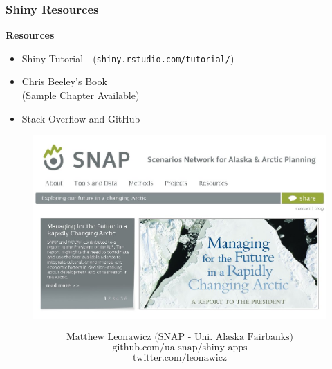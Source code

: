 \documentclass{beamer}
\begin{document}
\begin{frame}
\Large
\frametitle{Shiny Resources}
\vspace{-1.5cm}
\textbf{Resources}
\begin{itemize}

\item Shiny Tutorial - (\texttt{shiny.rstudio.com/tutorial/})
\item Chris Beeley's Book\\ (Sample Chapter Available)
\item Stack-Overflow and GitHub 
\end{itemize}

\end{frame}
\begin{frame}
\begin{figure}
\vspace{0.5cm}
\centering
\includegraphics[width=0.75\linewidth]{./snap2}

\end{figure}
\Large
\[ \mbox{Matthew Leonawicz (SNAP - Uni. Alaska Fairbanks)}  \]
\[\mbox{github.com/ua-snap/shiny-apps}‎\]
\[ \mbox{twitter.com/leonawicz} \]

\end{frame}
\end{document}
